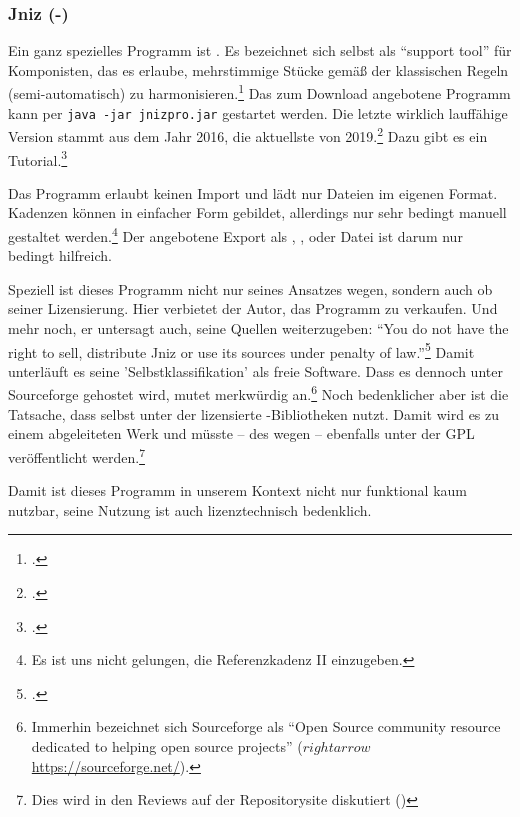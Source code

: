 %
%
%




\subsubsection{Jniz (-)}

\label{Jniz}Ein ganz spezielles Programm ist . Es bezeichnet sich
selbst als \enquote{support tool} für Komponisten, das es erlaube, mehrstimmige
Stücke gemäß der klassischen Regeln (semi-automatisch) zu
harmonisieren.\footcite[vgl.][\nopage wp]{Grandjean2019a} Das zum Download
angebotene Programm kann per \texttt{java -jar jnizpro.jar} gestartet werden.
Die letzte wirklich lauffähige Version stammt aus dem Jahr 2016, die aktuellste
von 2019.\footcite[vgl.][\nopage wp]{Jniz2019b} Dazu gibt es ein
Tutorial.\footcite[vgl.][\nopage wp]{Grandjean2019c}

Das Programm erlaubt keinen Import und lädt nur Dateien im eigenen Format.
Kadenzen können in einfacher Form gebildet, allerdings nur sehr bedingt manuell
gestaltet werden.\footnote{Es ist uns nicht gelungen, die Referenzkadenz II
einzugeben.} Der angebotene Export als , ,
 oder Datei ist darum nur bedingt hilfreich.

Speziell ist dieses Programm nicht nur seines Ansatzes wegen, sondern auch ob
seiner Lizensierung. Hier verbietet der Autor, das Programm zu verkaufen. Und
mehr noch, er untersagt auch, seine Quellen weiterzugeben: \enquote{You do not
have the right to sell, distribute Jniz or use its sources under penalty of
law.}\footcite[vgl.][\nopage wp]{Grandjean2019b} Damit unterläuft es seine
'Selbstklassifikation' als freie Software. Dass es dennoch unter Sourceforge
gehostet wird, mutet merkwürdig an.\footnote{Immerhin bezeichnet sich
Sourceforge als \enquote{Open Source community resource dedicated to helping
open source projects} ($rightarrow$ \href{https://sourceforge.net/}
{https://sourceforge.net/}).} Noch bedenklicher aber ist die Tatsache, dass
 selbst unter der  lizensierte -Bibliotheken
nutzt. Damit wird es zu einem abgeleiteten Werk und müsste -- des
 wegen -- ebenfalls unter der GPL veröffentlicht
werden.\footnote{Dies wird in den Reviews auf der Repositorysite diskutiert
(\cite[vgl.][\nopage wp]{Jniz2019a})}

Damit ist dieses Programm in unserem Kontext nicht nur funktional kaum nutzbar,
seine Nutzung ist auch lizenztechnisch bedenklich.



%
